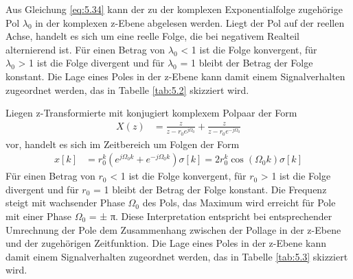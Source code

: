 Aus Gleichung \eqref{eq:5.34} kann der zu der komplexen Exponentialfolge zugehörige Pol \(λ_{0}\) in der komplexen z-Ebene abgelesen werden. Liegt der Pol auf der reellen Achse, handelt es sich um eine reelle Folge, die bei negativem Realteil alternierend ist. Für einen Betrag von \textbar \(λ_{0}\)\textbar{} \textless{} 1 ist die Folge konvergent, für\\
\textbar \(λ_{0}\)\textbar{} \textgreater{} 1 ist die Folge divergent und für \textbar \(λ_{0}\)\textbar{} = 1 bleibt der Betrag der Folge konstant. Die Lage eines Poles in der z-Ebene kann damit einem Signalverhalten zugeordnet werden, das in Tabelle \ref{tab:5.2} skizziert wird.

Liegen z-Transformierte mit konjugiert komplexem Polpaar der Form
\begin{align}
X(z) &= \frac{z}{z - r_{0}  e^{j  \Omega_{0}}} + \frac{z}{z - r_{0}  e^{- j  \Omega_{0}}} \label{eq:5.35}
\end{align}
vor, handelt es sich im Zeitbereich um Folgen der Form
\begin{align}
x[ k] &= r_{0}^{k}  \left( e^{j  \Omega_{0}  k} + e^{- j  \Omega_{0}  k} \right)  \sigma[ k] = 2  r_{0}^{k}  \cos\left( \Omega_{0}  k \right)  \sigma[ k] \label{eq:5.36}
\end{align}
Für einen Betrag von \textbar \(r_{0}\)\textbar{} \textless{} 1 ist die Folge konvergent, für \textbar \(r_{0}\)\textbar{} \textgreater{} 1 ist die Folge divergent und für \textbar \(r_{0}\)\textbar{} = 1 bleibt der Betrag der Folge konstant. Die Frequenz steigt mit wachsender Phase \(Ω_{0}\) des Pols, das Maximum wird erreicht für Pole mit einer Phase \(Ω_{0}\) = ± π. Diese Interpretation entspricht bei entsprechender Umrechnung der Pole dem Zusammenhang zwischen der Pollage in der z-Ebene und der zugehörigen Zeitfunktion. Die Lage eines Poles in der z-Ebene kann damit einem Signalverhalten zugeordnet werden, das in Tabelle \ref{tab:5.3} skizziert wird.

